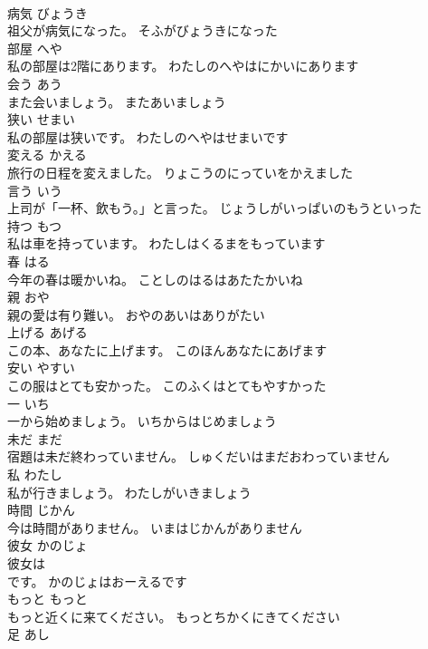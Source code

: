\documentclass[8pt]{extreport}
\begin{document}
\begin{CJK}{UTF8}{min}
\\	病気	びょうき	
\\	祖父が病気になった。	そふがびょうきになった	
\\	部屋	へや	
\\	私の部屋は2階にあります。	わたしのへやはにかいにあります	
\\	会う	あう	
\\	また会いましょう。	またあいましょう	
\\	狭い	せまい	
\\	私の部屋は狭いです。	わたしのへやはせまいです	
\\	変える	かえる	
\\	旅行の日程を変えました。	りょこうのにっていをかえました	
\\	言う	いう	
\\	上司が「一杯、飲もう。」と言った。	じょうしがいっぱいのもうといった	
\\	持つ	もつ	
\\	私は車を持っています。	わたしはくるまをもっています	
\\	春	はる	
\\	今年の春は暖かいね。	ことしのはるはあたたかいね	
\\	親	おや	
\\	親の愛は有り難い。	おやのあいはありがたい	
\\	上げる	あげる	
\\	この本、あなたに上げます。	このほんあなたにあげます	
\\	安い	やすい	
\\	この服はとても安かった。	このふくはとてもやすかった	
\\	一	いち	
\\	一から始めましょう。	いちからはじめましょう	
\\	未だ	まだ	
\\	宿題は未だ終わっていません。	しゅくだいはまだおわっていません	
\\	私	わたし	
\\	私が行きましょう。	わたしがいきましょう	
\\	時間	じかん	
\\	今は時間がありません。	いまはじかんがありません	
\\	彼女	かのじょ	
\\	彼女は
\\	です。	かのじょはおーえるです	
\\	もっと	もっと	
\\	もっと近くに来てください。	もっとちかくにきてください	
\\	足	あし	

\end{CJK}
\end{document}
